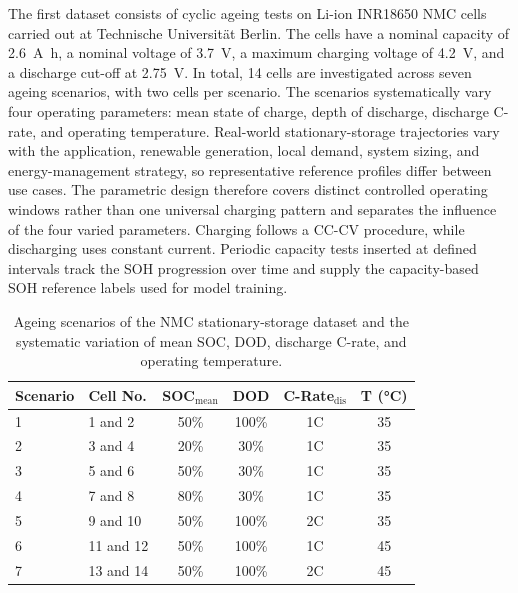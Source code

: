 \documentclass[
    a4paper,
    12pt,
    titlepage,
    bibliography=totoc,
    twoside=on,
    parskip=false,
    numbers=noenddot,
    cleardoublepage=empty,
    DIV=12,
    BCOR=12.0mm,
    headheight=36pt,
    headings=openright
]{scrreprt}
\begin{document}
The first dataset consists of cyclic ageing tests on Li-ion INR18650 NMC cells carried out at Technische Universit\"at Berlin. The cells have a nominal capacity of \SI{2.6}{\ampere\hour}, a nominal voltage of \SI{3.7}{\volt}, a maximum charging voltage of \SI{4.2}{\volt}, and a discharge cut-off at \SI{2.75}{\volt}. In total, 14 cells are investigated across seven ageing scenarios, with two cells per scenario. The scenarios systematically vary four operating parameters: mean state of charge, depth of discharge, discharge C-rate, and operating temperature. Real-world stationary-storage trajectories vary with the application, renewable generation, local demand, system sizing, and energy-management strategy, so representative reference profiles differ between use cases.\autocite{kucevicStandardBatteryEnergy2020a} The parametric design therefore covers distinct controlled operating windows rather than one universal charging pattern and separates the influence of the four varied parameters. Charging follows a CC-CV procedure, while discharging uses constant current. Periodic capacity tests inserted at defined intervals track the SOH progression over time and supply the capacity-based SOH reference labels used for model training.

\begin{table}[H]
    \centering
    \caption[Stationary-storage ageing scenarios.]{Ageing scenarios of the NMC stationary-storage dataset and the systematic variation of mean SOC, DOD, discharge C-rate, and operating temperature.}
    \label{tab:paper1_scenarios}
    \begin{tabularx}{\textwidth}{@{}llcccc@{}}
        \toprule
        Scenario & Cell No. & SOC$_\mathrm{mean}$ & DOD & C-Rate$_\mathrm{dis}$ & T (\si{\celsius}) \\
        \midrule
        1 & 1 and 2 & 50\% & 100\% & 1C & 35 \\
        2 & 3 and 4 & 20\% & 30\% & 1C & 35 \\
        3 & 5 and 6 & 50\% & 30\% & 1C & 35 \\
        4 & 7 and 8 & 80\% & 30\% & 1C & 35 \\
        5 & 9 and 10 & 50\% & 100\% & 2C & 35 \\
        6 & 11 and 12 & 50\% & 100\% & 1C & 45 \\
        7 & 13 and 14 & 50\% & 100\% & 2C & 45 \\
        \bottomrule
    \end{tabularx}
\end{table}
\end{document}
